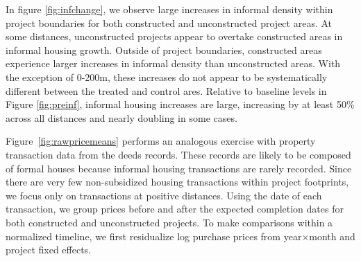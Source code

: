 \documentclass[12pt]{article}
\begin{document}
In figure \ref{fig:infchange}, we observe large increases in informal density within project boundaries for both constructed and unconstructed project areas.  At some distances, unconstructed projects appear to overtake constructed areas in informal housing growth.  Outside of project boundaries, constructed areas experience larger increases in informal density than unconstructed areas. With the exception of 0-200m, these increases do not appear to be systematically different between the treated and control ares. 
Relative to baseline levels in Figure \ref{fig:preinf}, informal housing increases are large, increasing by at least 50\% across all distances and nearly doubling in some cases.

Figure~\ref{fig:rawpricemeans} performs an analogous exercise with property transaction data from the deeds records.  These records are likely to be composed of formal houses because informal housing transactions are rarely recorded.  Since there are very few non-subsidized housing transactions within project footprints, we focus only on transactions at positive distances.  Using the date of each transaction, we group prices before and after the expected completion dates for both constructed and unconstructed projects. To make comparisons within a normalized timeline, we first residualize log purchase prices from year$\times$month and project fixed effects.
\end{document}
